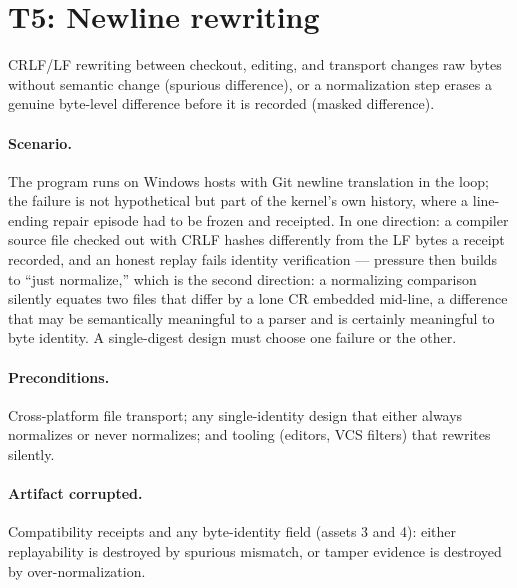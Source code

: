 \section{T5: Newline rewriting}\label{threat:t5}

\begin{threat}\label{threat:thr:newline}
CRLF/LF rewriting between checkout, editing, and transport changes raw bytes without semantic change (spurious difference), or a normalization step erases a genuine byte-level difference before it is recorded (masked difference).
\end{threat}

\paragraph{Scenario.} The program runs on Windows hosts with Git newline translation in the loop; the failure is not hypothetical but part of the kernel's own history, where a line-ending repair episode had to be frozen and receipted. In one direction: a compiler source file checked out with CRLF hashes differently from the LF bytes a receipt recorded, and an honest replay fails identity verification --- pressure then builds to ``just normalize,'' which is the second direction: a normalizing comparison silently equates two files that differ by a lone CR embedded mid-line, a difference that may be semantically meaningful to a parser and is certainly meaningful to byte identity. A single-digest design must choose one failure or the other.

\paragraph{Preconditions.} Cross-platform file transport; any single-identity design that either always normalizes or never normalizes; and tooling (editors, VCS filters) that rewrites silently.

\paragraph{Artifact corrupted.} Compatibility receipts and any byte-identity field (assets 3 and 4): either replayability is destroyed by spurious mismatch, or tamper evidence is destroyed by over-normalization.


